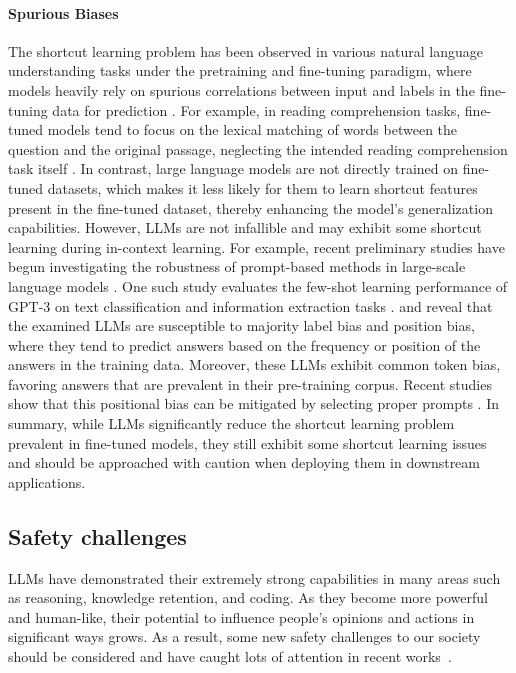 \documentclass[manuscript,screen, nonacm]{acmart}
\begin{document}
\paragraph{Spurious Biases}
The shortcut learning problem has been observed in various natural language understanding tasks under the pretraining and fine-tuning paradigm, where models heavily rely on spurious correlations between input and labels in the fine-tuning data for prediction \cite{geirhos2020shortcut, tang2021mitigating, du2022shortcut}. For example, in reading comprehension tasks, fine-tuned models tend to focus on the lexical matching of words between the question and the original passage, neglecting the intended reading comprehension task itself \cite{lai2021machine}. %
In contrast, large language models are not directly trained on fine-tuned datasets, which makes it less likely for them to learn shortcut features present in the fine-tuned dataset, thereby enhancing the model's generalization capabilities. However, LLMs are not infallible and may exhibit some shortcut learning during in-context learning. For example, recent preliminary studies have begun investigating the robustness of prompt-based methods in large-scale language models \cite{zhao2021calibrate, webson2022prompt}. One such study evaluates the few-shot learning performance of GPT-3 on text classification and information extraction tasks \cite{zhao2021calibrate}. and reveal that the examined LLMs are susceptible to majority label bias and position bias, where they tend to predict answers based on the frequency or position of the answers in the training data. Moreover, these LLMs exhibit common token bias, favoring answers that are prevalent in their pre-training corpus. Recent studies show that this positional bias can be mitigated by selecting proper prompts \cite{lu2022fantastically}.
In summary, while LLMs significantly reduce the shortcut learning problem prevalent in fine-tuned models, they still exhibit some shortcut learning issues and should be approached with caution when deploying them in downstream applications.

\subsection{Safety challenges}
LLMs have demonstrated their extremely strong capabilities in many areas such as reasoning, knowledge retention, and coding. As they become more powerful and human-like, their potential to influence people's opinions and actions in significant ways grows. As a result, some new safety challenges to our society should be considered and have caught lots of attention in recent works~\cite{openai2023gpt4, openai2023gpt4-sys}. 
\end{document}
